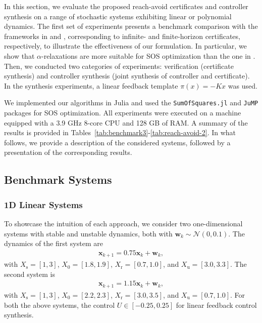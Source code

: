 \documentclass[journal,twoside,web]{ieeecolor}
\newcommand{\ml}[1]{{\color{blue}[ML: #1]}}
\newcommand{\unsafe}{\mathrm{u}}
\newcommand{\safe}{\mathrm{s}}
\newcommand{\reach}{\mathrm{r}}
\newcommand{\initial}{\mathrm{0}}
\newcommand{\pw}{\mathbf{w}}
\newcommand{\px}{\mathbf{x}}
\newcommand{\N}{\mathcal{N}}
\newcommand{\RA}{\mathcal{R}}
\newcommand{\rv}[1]{\textcolor{blue}{#1}}
\theoremstyle{definition}
\theoremstyle{plain}
\theoremstyle{plain}
\begin{document}
In this section, we evaluate the proposed reach-avoid certificates and controller synthesis on a range of stochastic systems exhibiting linear or polynomial dynamics. 
The first set of experiments presents a benchmark comparison with the frameworks in \cite{vzikelic2023learning} and \cite{xue2025finite}, corresponding to infinite- and finite-horizon certificates, respectively, to illustrate the effectiveness of our formulation.
In particular, we show that $\alpha$-relaxations are more suitable for SOS optimization than the one in \cite{vzikelic2023learning}. Then, we conducted two categories of experiments: verification (certificate synthesis) and controller synthesis (joint synthesis of controller and certificate). 
In the synthesis experiments, a linear feedback template $\pi(x) = -K x$ was used. 

We implemented our algorithms in Julia and used the \texttt{SumOfSquares.jl} \cite{weisser2019polynomial} and \texttt{JuMP} \cite{dunning2017jump} packages for SOS optimization. All experiments were executed on a machine equipped with a 3.9 GHz 8-core CPU and 128 GB of RAM. A summary of the results is provided in 
Tables~\ref{tab:benchmark3}-\ref{tab:reach-avoid-2}.
In what follows, we provide a description of the considered systems, followed by a presentation of the corresponding results. 


\subsection{Benchmark Systems}
\label{sec:benchsys}

\subsubsection{1D Linear Systems}
To showcase the intuition of each approach, we consider two one-dimensional systems with stable and unstable dynamics, both with $\pw_k \sim \N(0, 0.1)$. The dynamics of the first system are
\begin{align}
    \label{eq:1D_linear_stable}
    \px_{k+1} = 0.75 \px_k + \pw_k,
\end{align}
with \( X_{\safe} = [1, 3] \), \( X_{\initial} = [1.8, 1.9] \), \( X_{\reach} = [0.7, 1.0] \), and \( X_{\unsafe} = [3.0, 3.3] \).
The second system is
\begin{align}
    \label{eq:1D_linear_unstable}
    \px_{k+1} = 1.15 \px_k + \pw_k,
\end{align}
with \( X_{\safe}  = [1, 3] \), \( X_{\initial} = [2.2, 2.3] \),
\( X_{\reach} = [3.0, 3.5] \), and \(  X_{\unsafe}= [0.7, 1.0] \). 
For both the above systems, the control $U \in [-0.25, 0.25]$ for linear feedback control synthesis.
\end{document}
